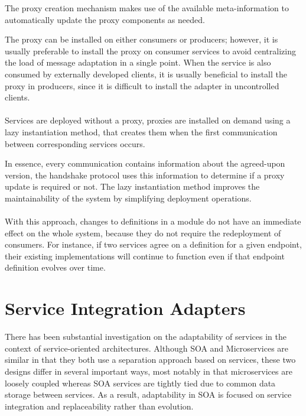 The proxy creation mechanism makes use of the available meta-information
to automatically update the proxy components as needed.

The proxy can be installed on either consumers or producers;
however, it is usually preferable to install the proxy on consumer services to avoid centralizing the load of message adaptation in a single point.
When the service is also consumed by externally developed clients,
it is usually beneficial to install the proxy in producers, since it is difficult to install the adapter in uncontrolled clients.

\paragraph{}

Services are deployed without a proxy, proxies are installed on demand using a lazy instantiation method, that creates them when the first communication between corresponding services occurs.

In essence, every communication contains information about the agreed-upon version, the handshake protocol uses this information to determine if a proxy update is required or not.
The lazy instantiation method improves the maintainability of the system by
simplifying deployment operations.

\paragraph{}

With this approach, changes to definitions in a module do not have an immediate effect on the whole system, because they do not require the redeployment of consumers.
For instance, if two services agree on a definition for a given endpoint,
their existing implementations will continue to function even if that endpoint definition evolves over time.

\section{Service Integration Adapters} %
\label{sec:service_integration_adapters}

There has been substantial investigation on the adaptability of services in the context of service-oriented architectures.
Although SOA \cite{7} and Microservices \cite{microservices} are similar in that they both use a separation approach based on services,
these two designs differ in several important ways, most notably in that microservices are loosely coupled whereas SOA services are tightly tied due to common data storage between services.
As a result, adaptability in SOA is focused on service integration and replaceability rather than evolution.

